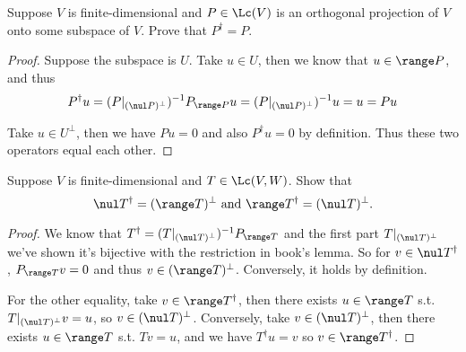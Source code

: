 \documentclass{extarticle}
\begin{document}


\begin{problem}{19}
    Suppose \(V\) is finite-dimensional and \(P \in \Lc(V)\) is an orthogonal projection of \(V\) onto 
    some subspace of \(V\). Prove that \(P^\dagger = P\).
\end{problem}

\begin{proof}
Suppose the subspace is \(U\). Take \(u \in U\), then we know that \(u \in \range P\), and thus  
\begin{align*}
    P^\dagger u = (P|_{(\nul P)^\perp})^{-1} P_{\range P} u =  (P|_{(\nul P)^\perp})^{-1} u  = u = Pu 
\end{align*}

Take \(u \in U^\perp\), then we have \(Pu = 0\) and also \(P^\dagger u = 0\) by definition. Thus these two operators 
equal each other.
\end{proof}

\begin{problem}{20}
    Suppose \(V\) is finite-dimensional and \(T \in \Lc(V, W)\). Show that 
    \[\nul T^\dagger = (\range T)^\perp \text{  and  } \range T^\dagger = (\nul T)^\perp.\]
\end{problem}

\begin{proof}
We know that \(T^\dagger = (T|_{(\nul T)^\perp})^{-1} P_{\range T}\) and the first part \(T|_{(\nul T)^\perp}\) 
we've shown it's bijective with the restriction in book's lemma. So for \(v \in \nul T^\dagger\), 
\(P_{\range T}v = 0\) and thus \(v \in (\range T)^\perp\). Conversely, it holds by definition. 

For the other equality, take \(v \in \range T^\dagger\), then there exists \(u \in \range T\) s.t. 
\(T|_{(\nul T)^\perp} v = u\), so \(v \in (\nul T)^\perp\). Conversely, take \(v \in (\nul T)^\perp\), then 
there exists \(u \in \range T\) s.t. \(Tv = u\), and we have \(T^\dagger u =v\) so \(v \in \range T^\dagger\).
\end{proof}
\end{document}
